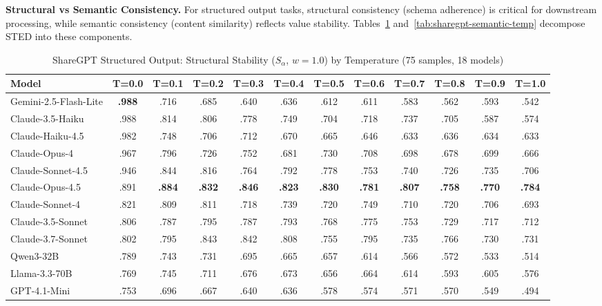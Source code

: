 \documentclass{article}
\theoremstyle{plain}
\theoremstyle{definition}
\begin{document}
\textbf{Structural vs Semantic Consistency.} For structured output tasks, structural consistency (schema adherence) is critical for downstream processing, while semantic consistency (content similarity) reflects value stability. Tables~\ref{tab:sharegpt-structural-temp} and~\ref{tab:sharegpt-semantic-temp} decompose STED into these components.

\begin{table}[t]
\centering
\caption{ShareGPT Structured Output: Structural Stability ($S_\alpha$, $w{=}1.0$) by Temperature (75 samples, 18 models)}
\label{tab:sharegpt-structural-temp}
\scriptsize
\begin{tabular}{@{}lccccccccccc@{}}
\toprule
\textbf{Model} & \textbf{T=0.0} & \textbf{T=0.1} & \textbf{T=0.2} & \textbf{T=0.3} & \textbf{T=0.4} & \textbf{T=0.5} & \textbf{T=0.6} & \textbf{T=0.7} & \textbf{T=0.8} & \textbf{T=0.9} & \textbf{T=1.0} \\
\midrule
Gemini-2.5-Flash-Lite & \textbf{.988} & .716 & .685 & .640 & .636 & .612 & .611 & .583 & .562 & .593 & .542 \\
Claude-3.5-Haiku & .988 & .814 & .806 & .778 & .749 & .704 & .718 & .737 & .705 & .587 & .574 \\
Claude-Haiku-4.5 & .982 & .748 & .706 & .712 & .670 & .665 & .646 & .633 & .636 & .634 & .633 \\
Claude-Opus-4 & .967 & .796 & .726 & .752 & .681 & .730 & .708 & .698 & .678 & .699 & .666 \\
Claude-Sonnet-4.5 & .946 & .844 & .816 & .764 & .792 & .778 & .753 & .740 & .726 & .735 & .706 \\
Claude-Opus-4.5 & .891 & \textbf{.884} & \textbf{.832} & \textbf{.846} & \textbf{.823} & \textbf{.830} & \textbf{.781} & \textbf{.807} & \textbf{.758} & \textbf{.770} & \textbf{.784} \\
Claude-Sonnet-4 & .821 & .809 & .811 & .718 & .739 & .720 & .749 & .710 & .720 & .706 & .693 \\
Claude-3.5-Sonnet & .806 & .787 & .795 & .787 & .793 & .768 & .775 & .753 & .729 & .717 & .712 \\
Claude-3.7-Sonnet & .802 & .795 & .843 & .842 & .808 & .755 & .795 & .735 & .766 & .730 & .731 \\
Qwen3-32B & .789 & .743 & .731 & .695 & .665 & .657 & .614 & .566 & .572 & .533 & .514 \\
Llama-3.3-70B & .769 & .745 & .711 & .676 & .673 & .656 & .664 & .614 & .593 & .605 & .576 \\
GPT-4.1-Mini & .753 & .696 & .667 & .640 & .636 & .578 & .574 & .571 & .570 & .549 & .494 \\

\end{tabular}
\end{table}
\end{document}
